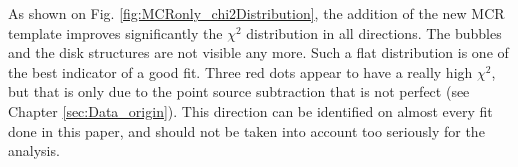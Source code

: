 
As shown on Fig. \ref{fig:MCRonly_chi2Distribution}, the addition of the new MCR template improves significantly the $\chi^2$ distribution in all directions. The bubbles and the disk structures are not visible any more. Such a flat distribution is one of the best indicator of a good fit.
Three red dots appear to have a really high $\chi^2$, but that is only due to the point source subtraction that is not perfect (see Chapter \ref{sec:Data_origin}). This direction can be identified on almost every fit done in this paper, and should not be taken into account too seriously for the analysis.

